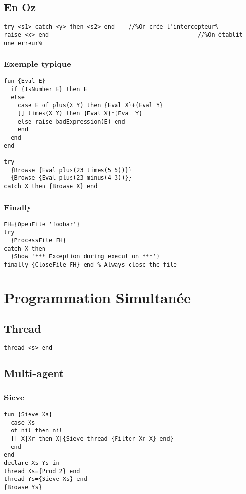\documentclass{report}
\begin{document}
\subsection{En Oz}\begin{lstlisting}[escapechar=\%]
try <s1> catch <y> then <s2> end	//%On crée l'intercepteur%
raise <x> end											//%On établit une erreur%
\end{lstlisting}

\subsubsection{Exemple typique}
\begin{lstlisting}[escapechar=\%]
fun {Eval E} 
  if {IsNumber E} then E 
  else
    case E of plus(X Y) then {Eval X}+{Eval Y} 
    [] times(X Y) then {Eval X}*{Eval Y} 
    else raise badExpression(E) end 
    end
  end
end 

try
  {Browse {Eval plus(23 times(5 5))}} 
  {Browse {Eval plus(23 minus(4 3))}}
catch X then {Browse X} end
\end{lstlisting}

\subsubsection{Finally}
\begin{lstlisting}
FH={OpenFile 'foobar'} 
try 
  {ProcessFile FH}
catch X then 
  {Show '*** Exception during execution ***'}
finally {CloseFile FH} end % Always close the file
\end{lstlisting}

\section{Programmation Simultanée}
\subsection{Thread}
\begin{lstlisting}[escapechar=\%]
thread <s> end
\end{lstlisting}

\subsection{Multi-agent}
\subsubsection{Sieve}
\begin{lstlisting}[escapechar=\%]
fun {Sieve Xs}
  case Xs
  of nil then nil
  [] X|Xr then X|{Sieve thread {Filter Xr X} end} 
  end
end 
declare Xs Ys in
thread Xs={Prod 2} end 
thread Ys={Sieve Xs} end
{Browse Ys}
\end{lstlisting}
\end{document}
